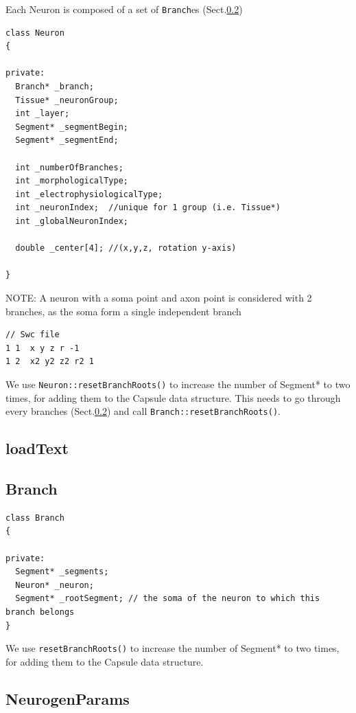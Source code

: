 Each Neuron is composed of a set of \verb!Branch!es (Sect.\ref{sec:Branch})
\begin{verbatim}
class Neuron
{

private:
  Branch* _branch;
  Tissue* _neuronGroup;
  int _layer;
  Segment* _segmentBegin;
  Segment* _segmentEnd;
  
  int _numberOfBranches;
  int _morphologicalType;
  int _electrophysiologicalType;
  int _neuronIndex;  //unique for 1 group (i.e. Tissue*)
  int _globalNeuronIndex;
  
  double _center[4]; //(x,y,z, rotation y-axis)
  
}
\end{verbatim}

NOTE: A neuron with a soma point and axon point is considered with 2 branches,
as the soma form a single independent branch
\begin{verbatim}
// Swc file
1 1  x y z r -1
1 2  x2 y2 z2 r2 1
\end{verbatim}

We use \verb!Neuron::resetBranchRoots()! to increase the number of Segment* to
two times, for adding them to the Capsule data structure.
This needs to go through every branches (Sect.\ref{sec:Branch}) and call
\verb!Branch::resetBranchRoots()!.

\subsection{loadText}
\label{sec:Neuron-loadText}




\subsection{Branch}
\label{sec:Branch}

\begin{verbatim}
class Branch
{

private:
  Segment* _segments;
  Neuron* _neuron;
  Segment* _rootSegment; // the soma of the neuron to which this branch belongs
}
\end{verbatim}

We use \verb!resetBranchRoots()! to increase the number of Segment* to two
times, for adding them to the Capsule data structure.

\subsection{NeurogenParams}
\label{sec:NeurogenParams}


